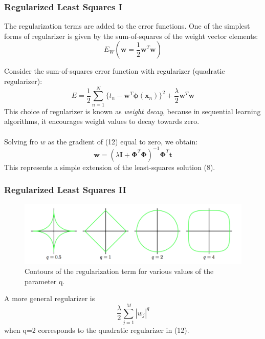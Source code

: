 \documentclass{beamer}
\begin{document}

\begin{frame}
\frametitle{Regularized Least Squares I}
The regularization terms are added to the error functions. One of the simplest forms of regularizer is given by the sum-of-squares of the weight vector elements:
\begin{equation}
E_W(\bm{w} = \frac{1}{2}\bm{w}^T\bm{w})
\end{equation}

Consider the sum-of-squares error function with regularizer (quadratic regularizer):
\begin{equation}
 E = \frac{1}{2}\sum_{n=1}^{N}\{t_n-\bm{w}^T\bm{\phi}(\bm{x}_n)\}^2+\frac{\lambda}{2}\bm{w}^T\bm{w}
\end{equation}
 This choice of regularizer is known as \textit{weight decay}, because in sequential learning algorithms, it encourages weight values to decay towards zero.\\~\\
 
 Solving fro $w$ as the gradient of (12) equal to zero, we obtain:
 \begin{equation}
 \bm{w} = (\lambda \bm{I} + \bm{\Phi}^T \bm{\Phi})^{-1} \bm{\Phi}^T\bm{t}
 \end{equation}
 This represents a simple extension of the least-squares solution (8).
 
\end{frame}



\begin{frame}
\frametitle{Regularized Least Squares II}

\begin{figure}
\includegraphics[width=12cm]{Figure3}
\caption{Contours of the regularization term for various values of the parameter q.}
\end{figure}

A more general regularizer is 
\begin{equation}
\frac{\lambda}{2} \sum_{j=1}^M|w_j|^q
\end{equation}
when q=2 corresponds to the quadratic regularizer in (12).\\~\\
\end{frame}
\end{document}

